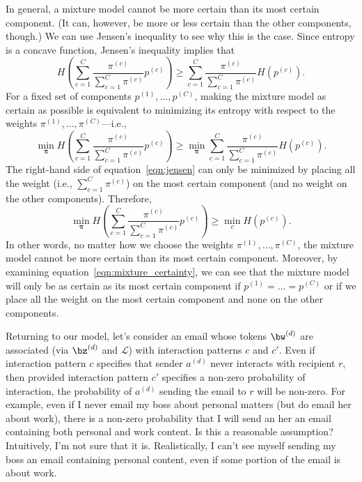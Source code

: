\documentclass[10pt,english,oneside]{article}
\begin{document}
In general, a mixture model cannot be more certain than its most
certain component. (It can, however, be more or less certain than the
other components, though.) We can use Jensen's inequality to see why
this is the case. Since entropy is a concave function, Jensen's
inequality implies that
\begin{equation}
  \label{eqn:jensen}
  H\left( \sum_{c=1}^C \frac{\pi^{(c)}}{\sum_{c=1}^C \pi^{(c)}}
  p^{(c)} \right) \geq \sum_{c=1}^C \frac{\pi^{(c)}}{\sum_{c=1}^C
    \pi^{(c)}} H\left(p^{(c)}\right).
\end{equation}
For a fixed set of components $p^{(1)}, \ldots, p^{(C)}$, making the
mixture model as certain as possible is equivalent to minimizing its
entropy with respect to the weights $\pi^{(1)}, \ldots,
\pi^{(C)}$---i.e.,
\begin{equation}
  \min_{\boldsymbol{\pi}} H\left( \sum_{c=1}^C
  \frac{\pi^{(c)}}{\sum_{c=1}^C \pi^{(c)}} p^{(c)} \right) \geq
  \min_{\boldsymbol{\pi}}\sum_{c=1}^C \frac{\pi^{(c)}}{\sum_{c=1}^C
    \pi^{(c)}} H\left(p^{(c)}\right).
\end{equation}
The right-hand side of equation~\ref{eqn:jensen} can only be minimized
by placing all the weight (i.e., $\sum_{c=1}^C \pi^{(c)}$) on the most
certain component (and no weight on the other components). Therefore,
\begin{equation}
  \label{eqn:mixture_certainty}
  \min_{\boldsymbol{\pi}} H\left( \sum_{c=1}^C
  \frac{\pi^{(c)}}{\sum_{c=1}^C \pi^{(c)}} p^{(c)} \right) \geq
  \min_{c} H\left(p^{(c)}\right).
\end{equation}
In other words, no matter how we choose the weights $\pi^{(1)},
\ldots, \pi^{(C)}$, the mixture model cannot be more certain than its
most certain component. Moreover, by examining
equation~\ref{eqn:mixture_certainty}, we can see that the mixture
model will only be as certain as its most certain component if
$p^{(1)} = \ldots = p^{(C)}$ or if we place all the weight on the most
certain component and none on the other components.

Returning to our model, let's consider an email whose tokens
$\bw^{(d)}$ are associated (via $\bz^{(d)}$ and $\mathcal{L}$) with
interaction patterns $c$ and $c'$. Even if interaction pattern $c$
specifies that sender $a^{(d)}$ never interacts with recipient $r$,
then provided interaction pattern $c'$ specifies a non-zero
probability of interaction, the probability of $a^{(d)}$ sending the
email to $r$ will be non-zero. For example, even if I never email my
boss about personal matters (but do email her about work), there is a
non-zero probability that I will send an her an email containing both
personal and work content. Is this a reasonable assumption?
Intuitively, I'm not sure that it is. Realistically, I can't see
myself sending my boss an email containing personal content, even if
some portion of the email is about work.
\end{document}
